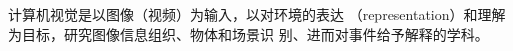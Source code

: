 \documentclass{article}
\begin{document}
\begin{section}
计算机视觉是以图像（视频）为输入，以对环境的表达
（representation）和理解为目标，研究图像信息组织、物体和场景识
别、进而对事件给予解释的学科。
\end{section}
\end{document}
